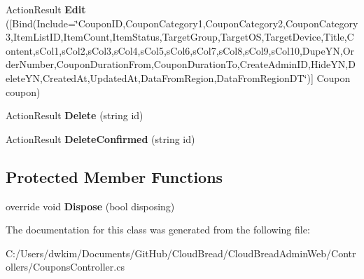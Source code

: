\begin{DoxyCompactItemize}
\item 
Action\+Result {\bfseries Edit} (\mbox{[}Bind(Include=\char`\"{}Coupon\+ID,Coupon\+Category1,Coupon\+Category2,Coupon\+Category3,Item\+List\+ID,Item\+Count,Item\+Status,Target\+Group,Target\+OS,Target\+Device,Title,Content,s\+Col1,s\+Col2,s\+Col3,s\+Col4,s\+Col5,s\+Col6,s\+Col7,s\+Col8,s\+Col9,s\+Col10,Dupe\+YN,Order\+Number,Coupon\+Duration\+From,Coupon\+Duration\+To,Create\+Admin\+ID,Hide\+YN,Delete\+YN,Created\+At,Updated\+At,Data\+From\+Region,Data\+From\+Region\+DT\char`\"{})\mbox{]} Coupon coupon)\hypertarget{a00071_a415857b2d9920c1a983dcb7c5e0a8907}{}\label{a00071_a415857b2d9920c1a983dcb7c5e0a8907}

\item 
Action\+Result {\bfseries Delete} (string id)\hypertarget{a00071_afd61a6573b0021000457cdb396553d5f}{}\label{a00071_afd61a6573b0021000457cdb396553d5f}

\item 
Action\+Result {\bfseries Delete\+Confirmed} (string id)\hypertarget{a00071_a7e650ebeb88a7019d2f5b9bd1dea2a63}{}\label{a00071_a7e650ebeb88a7019d2f5b9bd1dea2a63}

\end{DoxyCompactItemize}
\subsection*{Protected Member Functions}
\begin{DoxyCompactItemize}
\item 
override void {\bfseries Dispose} (bool disposing)\hypertarget{a00071_a2a75abe700e452a7e64bbed73a835ad4}{}\label{a00071_a2a75abe700e452a7e64bbed73a835ad4}

\end{DoxyCompactItemize}


The documentation for this class was generated from the following file\+:\begin{DoxyCompactItemize}
\item 
C\+:/\+Users/dwkim/\+Documents/\+Git\+Hub/\+Cloud\+Bread/\+Cloud\+Bread\+Admin\+Web/\+Controllers/Coupons\+Controller.\+cs\end{DoxyCompactItemize}
